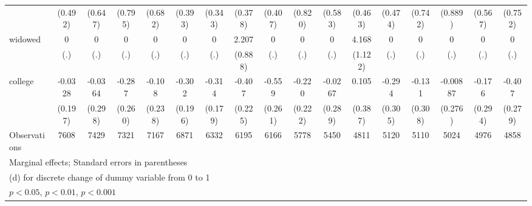 {\begin{tabular}{l*{16}{c}}
                    &     (0.492)         &     (0.647)         &     (0.795)         &     (0.682)         &     (0.393)         &     (0.343)         &     (0.378)         &     (0.407)         &     (0.820)         &     (0.583)         &     (0.463)         &     (0.474)         &     (0.742)         &     (0.889)         &     (0.567)         &     (0.752)         \\
[1em]
widowed             &           0         &           0         &           0         &           0         &           0         &           0         &       2.207\sym{*}  &           0         &           0         &           0         &       4.168\sym{***}&           0         &           0         &           0         &           0         &           0         \\
                    &         (.)         &         (.)         &         (.)         &         (.)         &         (.)         &         (.)         &     (0.888)         &         (.)         &         (.)         &         (.)         &     (1.122)         &         (.)         &         (.)         &         (.)         &         (.)         &         (.)         \\
[1em]
college             &     -0.0328         &     -0.0364         &      -0.287         &      -0.108         &      -0.302         &      -0.314         &      -0.407         &      -0.559\sym{*}  &      -0.220         &     -0.0267         &       0.105         &      -0.294         &      -0.131         &    -0.00887         &      -0.176         &      -0.407         \\
                    &     (0.197)         &     (0.298)         &     (0.260)         &     (0.238)         &     (0.196)         &     (0.179)         &     (0.225)         &     (0.261)         &     (0.222)         &     (0.289)         &     (0.387)         &     (0.305)         &     (0.308)         &     (0.276)         &     (0.294)         &     (0.279)         \\
\hline
Observations        &        7608         &        7429         &        7321         &        7167         &        6871         &        6332         &        6195         &        6166         &        5778         &        5450         &        4811         &        5120         &        5110         &        5024         &        4976         &        4858         \\
\hline\hline
\multicolumn{17}{l}{\footnotesize Marginal effects; Standard errors in parentheses}\\
\multicolumn{17}{l}{\footnotesize  (d) for discrete change of dummy variable from 0 to 1}\\
\multicolumn{17}{l}{\footnotesize \sym{*} \(p<0.05\), \sym{**} \(p<0.01\), \sym{***} \(p<0.001\)}\\
\end{tabular}
}
